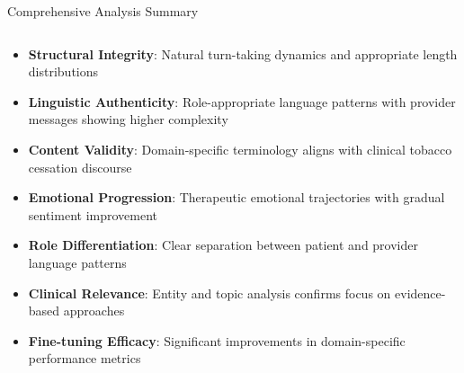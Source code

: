 \begin{frame}{Comprehensive Analysis Summary}
  \begin{columns}
    \begin{column}{\textwidth}
      \footnotesize
      \begin{itemize}
        \item \textbf{Structural Integrity}: Natural turn-taking dynamics and appropriate length distributions
        
        \item \textbf{Linguistic Authenticity}: Role-appropriate language patterns with provider messages showing higher complexity
        
        \item \textbf{Content Validity}: Domain-specific terminology aligns with clinical tobacco cessation discourse
        
        \item \textbf{Emotional Progression}: Therapeutic emotional trajectories with gradual sentiment improvement
        
        \item \textbf{Role Differentiation}: Clear separation between patient and provider language patterns
        
        \item \textbf{Clinical Relevance}: Entity and topic analysis confirms focus on evidence-based approaches
        
        \item \textbf{Fine-tuning Efficacy}: Significant improvements in domain-specific performance metrics
      \end{itemize}
    \end{column}
    
      
      
  \end{columns}
\end{frame}